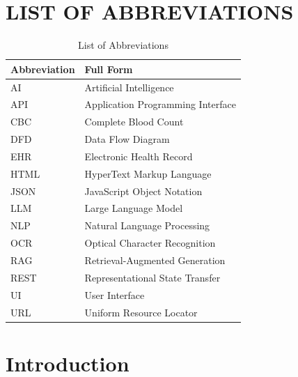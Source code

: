 \documentclass[12pt,a4paper]{report}
\begin{document}
\chapter*{LIST OF ABBREVIATIONS}

\begin{table}[h]
\centering
\caption{List of Abbreviations}
\begin{tabular}{|l|l|}
    \hline
    \textbf{Abbreviation} & \textbf{Full Form} \\
    \hline
    AI & Artificial Intelligence \\
    API & Application Programming Interface \\
    CBC & Complete Blood Count \\
    DFD & Data Flow Diagram \\
    EHR & Electronic Health Record \\
    HTML & HyperText Markup Language \\
    JSON & JavaScript Object Notation \\
    LLM & Large Language Model \\
    NLP & Natural Language Processing \\
    OCR & Optical Character Recognition \\
    RAG & Retrieval-Augmented Generation \\
    REST & Representational State Transfer \\
    UI & User Interface \\
    URL & Uniform Resource Locator \\
    \hline
\end{tabular}
\end{table}

\clearpage

\setcounter{page}{1}

\chapter{Introduction}
\end{document}
